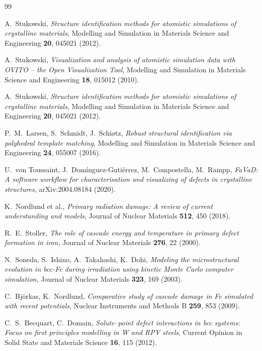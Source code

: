 \documentclass[11pt,a4paper]{article}
\theoremstyle{remark}
\begin{document}
\begin{thebibliography}{99}

A.~Stukowski,
\textit{Structure identification methods for atomistic simulations of
crystalline materials},
Modelling and Simulation in Materials Science and Engineering
\textbf{20}, 045021 (2012).

A.~Stukowski,
\textit{Visualization and analysis of atomistic simulation data with
OVITO – the Open Visualization Tool},
Modelling and Simulation in Materials Science and Engineering
\textbf{18}, 015012 (2010).

A.~Stukowski,
\textit{Structure identification methods for atomistic simulations of
crystalline materials},
Modelling and Simulation in Materials Science and Engineering
\textbf{20}, 045021 (2012).

P.~M.~Larsen, S.~Schmidt, J.~Schiøtz,
\textit{Robust structural identification via polyhedral template matching},
Modelling and Simulation in Materials Science and Engineering
\textbf{24}, 055007 (2016).

U.~von Toussaint, J.~Domínguez-Gutiérrez, M.~Compostella, M.~Rampp,
\textit{FaVaD: A software workflow for characterisation and visualizing
of defects in crystalline structures},
arXiv:2004.08184 (2020).

K.~Nordlund et al.,
\textit{Primary radiation damage: A review of current understanding
and models},
Journal of Nuclear Materials \textbf{512}, 450 (2018).

R.~E.~Stoller,
\textit{The role of cascade energy and temperature in primary defect
formation in iron},
Journal of Nuclear Materials \textbf{276}, 22 (2000).

N.~Soneda, S.~Ishino, A.~Takahashi, K.~Dohi,
\textit{Modeling the microstructural evolution in bcc-Fe during
irradiation using kinetic Monte Carlo computer simulation},
Journal of Nuclear Materials \textbf{323}, 169 (2003).

C.~Björkas, K.~Nordlund,
\textit{Comparative study of cascade damage in Fe simulated with
recent potentials},
Nuclear Instruments and Methods B \textbf{259}, 853 (2009).

C.~S.~Becquart, C.~Domain,
\textit{Solute--point defect interactions in bcc systems: Focus on
first principles modelling in W and RPV steels},
Current Opinion in Solid State and Materials Science \textbf{16}, 115
(2012).


\end{thebibliography}
\end{document}
